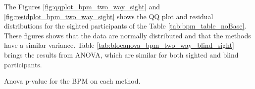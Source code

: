 %
%

The Figures \ref{fig:qqplot_bpm_two_way_sight} and \ref{fig:residplot_bpm_two_way_sight} shows the QQ plot and residual distributions for the sighted participants of the Table \ref{tab:bpm_table_noBase}. These figures shows that the data are normally distributed and that the methods have a similar variance. Table \ref{tab:blocanova_bpm_two_way_blind_sight} brings the results from ANOVA, which are similar for both sighted and blind participants.


\begin{table}
    \caption{Anova p-value for the BPM on each method.}
    \label{tab:blocanova_bpm_two_way_blind_sight}
\begin{minipage}{0.45\textwidth}
    
\end{minipage}
\begin{minipage}{0.45\textwidth}
    
\end{minipage}
\end{table}

